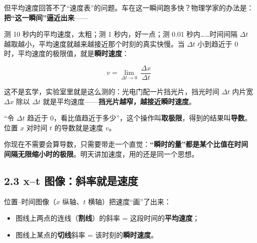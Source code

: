 \documentclass[UTF8,a4paper,11pt]{ctexart}
\begin{document}
但平均速度回答不了“速度表”的问题。车在这一瞬间跑多快？物理学家的办法是：\textbf{把“这一瞬间”逼近出来}——

测 10 秒内的平均速度，太粗；测 1 秒内，好一点；测 0.01 秒内……时间间隔 $\Delta t$ 越取越小，平均速度就越来越接近那个时刻的真实快慢。当 $\Delta t$ 小到趋近于 0 时，平均速度的极限值，就是\textbf{瞬时速度}：

\[
v = \lim_{\Delta t \to 0}\ \frac{\Delta x}{\Delta t}
\]

这不是玄学，实验室里就是这么测的：光电门配一片挡光片，挡光时间 $\Delta t$ 内片宽 $\Delta x$ 除以 $\Delta t$ 就是平均速度——\textbf{挡光片越窄，越接近瞬时速度}。

\begin{calcbox}
“令 $\Delta t$ 趋近于 0，看比值趋近于多少”，这个操作叫\textbf{取极限}，得到的结果叫\textbf{导数}。位置 $x$ 对时间 $t$ 的导数就是速度 $v$。

你现在不需要会算导数，只需要带走一个直觉：\textbf{“瞬时的量”都是某个比值在时间间隔无限缩小时的极限}。明天讲加速度，用的还是同一个思想。
\end{calcbox}

\subsection*{2.3 x–t 图像：斜率就是速度}

位置–时间图像（$x$ 纵轴、$t$ 横轴）把速度“画”了出来：

\begin{itemize}
  \item 图线上两点的连线（\textbf{割线}）的斜率 = 这段时间的\textbf{平均速度}；
  \item 图线上某点的\textbf{切线}斜率 = 该时刻的\textbf{瞬时速度}。
\end{itemize}

\begin{center}
\end{center}
\end{document}
